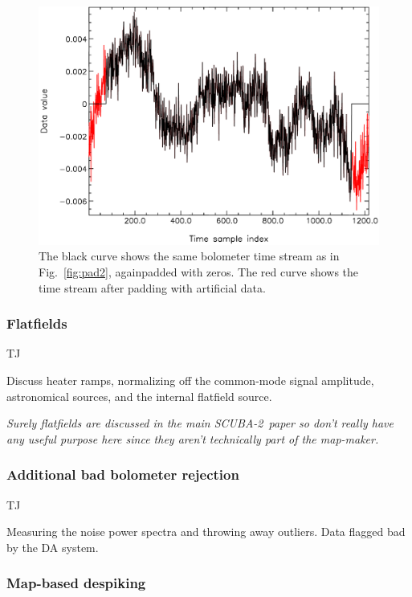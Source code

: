 \documentclass[useAMS,usenatbib,nofootinbib]{mn2e}
\newcommand{\scuba}{SCUBA-2}
\begin{document}
\begin{itemize}
\begin{figure}
\centering
\includegraphics[width=\linewidth]{pad1.pdf}
\caption{The black curve shows the same bolometer time stream as in
Fig.~\ref{fig:pad2}, againpadded with zeros. The red curve shows the
time stream after padding with artificial data.}
\label{fig:pad1}
\end{figure}

\end{itemize}

\subsubsection{Flatfields}
\label{sec:flatfields}

TJ

Discuss heater ramps, normalizing off the common-mode signal
amplitude, astronomical sources, and the internal flatfield source.

\textit{Surely flatfields are discussed in the main \scuba\ paper so
don't really have any useful purpose here since they aren't
technically part of the map-maker.}

\subsubsection{Additional bad bolometer rejection}

TJ

Measuring the noise power spectra and throwing away outliers. Data
flagged bad by the DA system.

\subsubsection{Map-based despiking}
\label{sec:mapdespike}
\end{document}
